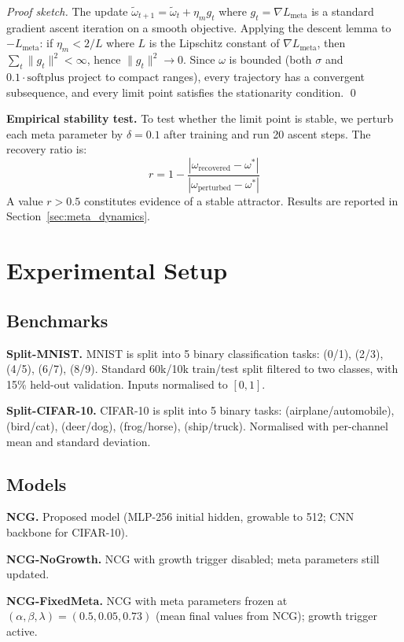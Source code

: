 \documentclass[conference]{IEEEtran}
\begin{document}
\textit{Proof sketch.} The update $\tilde{\omega}_{t+1} = \tilde{\omega}_t + \eta_m g_t$ where $g_t = \nabla L_{\mathrm{meta}}$ is a standard gradient ascent iteration on a smooth objective. Applying the descent lemma to $-L_{\mathrm{meta}}$: if $\eta_m < 2/L$ where $L$ is the Lipschitz constant of $\nabla L_{\mathrm{meta}}$, then $\sum_t \|g_t\|^2 < \infty$, hence $\|g_t\|^2 \to 0$. Since $\omega$ is bounded (both $\sigma$ and $0.1 \cdot \mathrm{softplus}$ project to compact ranges), every trajectory has a convergent subsequence, and every limit point satisfies the stationarity condition. \qed

\textbf{Empirical stability test.} To test whether the limit point is stable, we perturb each meta parameter by $\delta = 0.1$ after training and run 20 ascent steps. The recovery ratio is:
\begin{equation}
    r = 1 - \frac{|\omega_{\mathrm{recovered}} - \omega^*|}{|\omega_{\mathrm{perturbed}} - \omega^*|}
\end{equation}
A value $r > 0.5$ constitutes evidence of a stable attractor. Results are reported in Section~\ref{sec:meta_dynamics}.

\section{Experimental Setup}
\subsection{Benchmarks}
\textbf{Split-MNIST.} MNIST \cite{lecun1998} is split into 5 binary classification tasks: (0/1), (2/3), (4/5), (6/7), (8/9). Standard 60k/10k train/test split filtered to two classes, with 15\% held-out validation. Inputs normalised to $[0, 1]$.

\textbf{Split-CIFAR-10.} CIFAR-10 \cite{krizhevsky2009} is split into 5 binary tasks: (airplane/automobile), (bird/cat), (deer/dog), (frog/horse), (ship/truck). Normalised with per-channel mean and standard deviation.

\subsection{Models}
\textbf{NCG.} Proposed model (MLP-256 initial hidden, growable to 512; CNN backbone for CIFAR-10).

\textbf{NCG-NoGrowth.} NCG with growth trigger disabled; meta parameters still updated.

\textbf{NCG-FixedMeta.} NCG with meta parameters frozen at $(\alpha, \beta, \lambda) = (0.5, 0.05, 0.73)$ (mean final values from NCG); growth trigger active.
\end{document}
